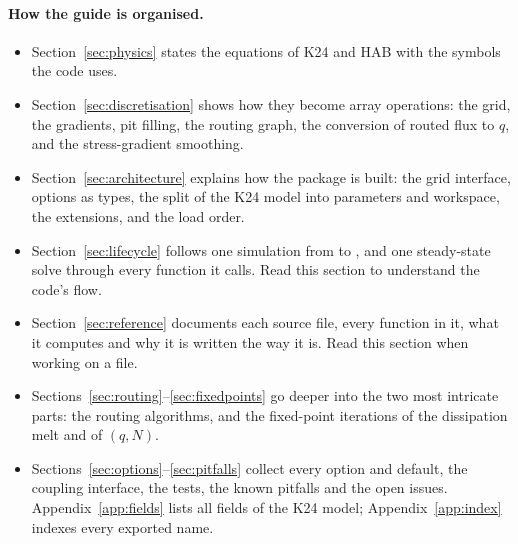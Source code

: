 \paragraph{How the guide is organised.}
\begin{itemize}[leftmargin=1.5em]
\item Section~\ref{sec:physics} states the equations of K24 and HAB with the symbols the code uses.
\item Section~\ref{sec:discretisation} shows how they become array operations: the grid, the gradients, pit
      filling, the routing graph, the conversion of routed flux to $q$, and the stress-gradient smoothing.
\item Section~\ref{sec:architecture} explains how the package is built: the grid interface, options as types,
      the split of the K24 model into parameters and workspace, the extensions, and the load order.
\item Section~\ref{sec:lifecycle} follows one simulation from  to , and one
      steady-state solve through every function it calls. Read this section to understand the code's flow.
\item Section~\ref{sec:reference} documents each source file, every function in it, what it computes and why it
      is written the way it is. Read this section when working on a file.
\item Sections~\ref{sec:routing}--\ref{sec:fixedpoints} go deeper into the two most intricate parts: the routing
      algorithms, and the fixed-point iterations of the dissipation melt and of $(q, N)$.
\item Sections~\ref{sec:options}--\ref{sec:pitfalls} collect every option and default, the coupling interface,
      the tests, the known pitfalls and the open issues. Appendix~\ref{app:fields} lists all fields of the K24
      model; Appendix~\ref{app:index} indexes every exported name.
\end{itemize}


